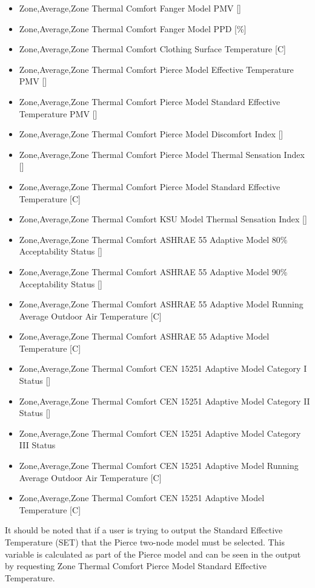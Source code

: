 \begin{itemize}
\item
  Zone,Average,Zone Thermal Comfort Fanger Model PMV {[]}
\item
  Zone,Average,Zone Thermal Comfort Fanger Model PPD {[}\%{]}
\item
  Zone,Average,Zone Thermal Comfort Clothing Surface Temperature {[}C{]}
\item
  Zone,Average,Zone Thermal Comfort Pierce Model Effective Temperature PMV {[]}
\item
  Zone,Average,Zone Thermal Comfort Pierce Model Standard Effective Temperature PMV {[]}
\item
  Zone,Average,Zone Thermal Comfort Pierce Model Discomfort Index {[]}
\item
  Zone,Average,Zone Thermal Comfort Pierce Model Thermal Sensation Index {[]}
\item
  Zone,Average,Zone Thermal Comfort Pierce Model Standard Effective Temperature {[C]}
\item
  Zone,Average,Zone Thermal Comfort KSU Model Thermal Sensation Index {[]}
\item
  Zone,Average,Zone Thermal Comfort ASHRAE 55 Adaptive Model 80\% Acceptability Status {[]}
\item
  Zone,Average,Zone Thermal Comfort ASHRAE 55 Adaptive Model 90\% Acceptability Status {[]}
\item
  Zone,Average,Zone Thermal Comfort ASHRAE 55 Adaptive Model Running Average Outdoor Air Temperature {[}C{]}
\item
  Zone,Average,Zone Thermal Comfort ASHRAE 55 Adaptive Model Temperature {[}C{]}
\item
  Zone,Average,Zone Thermal Comfort CEN 15251 Adaptive Model Category I Status {[]}
\item
  Zone,Average,Zone Thermal Comfort CEN 15251 Adaptive Model Category II Status {[]}
\item
  Zone,Average,Zone Thermal Comfort CEN 15251 Adaptive Model Category III Status
\item
  Zone,Average,Zone Thermal Comfort CEN 15251 Adaptive Model Running Average Outdoor Air Temperature {[}C{]}
\item
  Zone,Average,Zone Thermal Comfort CEN 15251 Adaptive Model Temperature {[}C{]}
\end{itemize}

It should be noted that if a user is trying to output the Standard Effective Temperature (SET) that the Pierce two-node model must be selected.  This variable is calculated as part of the Pierce model and can be seen in the output by requesting Zone Thermal Comfort Pierce Model Standard Effective Temperature.

